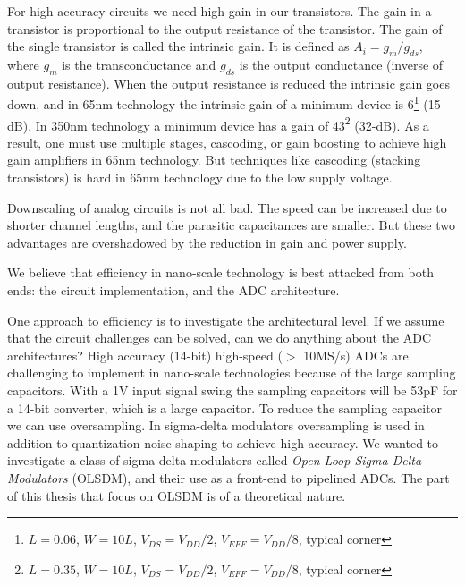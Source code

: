 For high accuracy circuits we need high gain in our transistors. The
gain in a transistor is proportional to the output resistance of the
transistor. The gain of the single transistor is called the intrinsic
gain. 
It is
  defined as $A_i =  g_m/g_{ds}$, where $g_m$ is the transconductance
  and $g_{ds}$ is the output conductance (inverse of output
  resistance). 
  When the output resistance is reduced the intrinsic gain
  goes down, and in 65nm technology the intrinsic gain of a minimum
  device is 6\footnote{$L=0.06$, $W=10L$, $V_{DS}=V_{DD}/2$,
    $V_{EFF} = V_{DD}/8$, typical corner} (15-dB). In 350nm technology a minimum 
  device has a gain of 43\footnote{$L=0.35$, $W=10L$, $V_{DS}
    = V_{DD}/2$, $V_{EFF} = V_{DD}/8$, typical corner} (32-dB). As a result, one must use multiple
  stages, cascoding, or gain boosting to achieve high gain amplifiers
 in 65nm technology. But techniques like cascoding (stacking
 transistors) is hard in 65nm technology due to the low supply
 voltage. 

Downscaling of analog circuits is not all bad. The speed can be
increased due to shorter channel lengths, and the parasitic
capacitances are smaller. But these two advantages are overshadowed by
the reduction in gain and power supply.


We believe that efficiency in nano-scale technology is best attacked
from both ends: the circuit implementation, and the ADC architecture.


One approach to efficiency is to investigate the architectural level. If we
assume that the circuit challenges can be solved, can we do anything
about the ADC architectures? High
accuracy (14-bit) high-speed ($>$ 10MS/s) ADCs are challenging to
implement in nano-scale technologies because of the large sampling
capacitors. With a 1V input
signal swing the
sampling capacitors will be 53pF for a 14-bit converter, which is a
large capacitor. To reduce the sampling capacitor we can use
oversampling. In sigma-delta modulators oversampling is used in
addition to quantization noise shaping to achieve high
accuracy. We wanted to investigate a class of sigma-delta modulators
called \textit{Open-Loop Sigma-Delta Modulators} (OLSDM), and their
use as a front-end to pipelined ADCs. The part of this thesis that
focus on OLSDM is of a theoretical nature.

